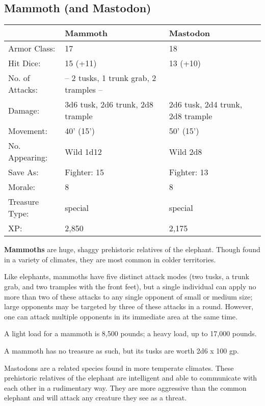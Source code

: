 \documentclass[a4paper,twoside,openany,10pt]{book}
\begin{document}
\begin{multicols}{2}
\subsection*{Mammoth (and Mastodon)}\label{mammoth-and-mastodon}

\begin{tabularx}{0.50\textwidth}{@{}lXX@{}}
& Mammoth & Mastodon \\\hline
Armor Class: & 17 & 18 \\\hline
Hit Dice: & 15 (+11) & 13 (+10) \\\hline
No. of Attacks: & -- 2 tusks, 1 trunk grab, 2 tramples -- & \\\hline
Damage: & 3d6 tusk, 2d6 trunk, 2d8 trample & 2d6 tusk, 2d4 trunk, 2d8 trample \\\hline
Movement: & 40' (15') & 50' (15') \\\hline
No. Appearing: & Wild 1d12 & Wild 2d8 \\\hline
Save As: & Fighter: 15 & Fighter: 13 \\\hline
Morale: & 8 & 8 \\\hline
Treasure Type: & special & special \\\hline
XP: & 2,850 & 2,175 \\\hline
\end{tabularx}\medskip

\textbf{Mammoths} are huge, shaggy prehistoric relatives of the elephant. Though found in a variety of climates, they are most common in colder territories.

Like elephants, mammoths have five distinct attack modes (two tusks, a trunk grab, and two tramples with the front feet), but a single individual can apply no more than two of these attacks to any single opponent of small or medium size; large opponents may be targeted by three of these attacks in a round. However, one can attack multiple opponents in its immediate area at the same time.

A light load for a mammoth is 8,500 pounds; a heavy load, up to 17,000 pounds.

A mammoth has no treasure as such, but its tusks are worth 2d6 x 100 gp. 

Mastodons are a related species found in more temperate climates. These prehistoric relatives of the elephant are intelligent and able to communicate with each other in a rudimentary way. They are more aggressive than the common elephant and will attack any creature they see as a threat. 


\end{multicols}
\end{document}
